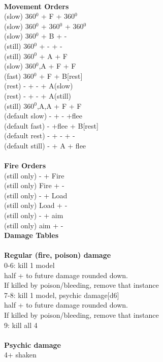 \ \\ {\bf Movement Orders } \\
(slow) 360$^0$ + F + 360$^0$ \\
(slow) 360$^0$ + 360$^0$ + 360$^0$ \\
(slow) 360$^0$ + B + - \\
(still) 360$^0$ + - + - \\
(still) 360$^0$ + A + F \\
(slow) 360$^0$,A + F + F \\
(fast) 360$^0$ + F + B[rest] \\
(rest) - + - + A(slow) \\
(rest) - + - + A(still) \\
(still) 360$^0$,A,A + F + F \\
(default slow) - + - +flee \\
(default fast) - +flee + B[rest] \\
(default rest) - + - + - \\
(default still) - + A + flee \\
\ \\ {\bf Fire Orders } \\
(still only) - + Fire \\
(still only) Fire + -  \\
(still only) - + Load \\
(still only) Load + - \\
(still only) - + aim \\
(still only) aim + -  \\



{\bf Damage Tables} \\
\ \\ {\bf Regular (fire, poison) damage } \\
0-6: kill 1 model\\ half + to future damage rounded down. \\ If killed by poison/bleeding, remove that instance \\
7-8: kill 1 model, psychic damage[d6]\\ half + to future damage rounded down. \\If killed by poison/bleeding, remove that instance \\
9: kill all 4 \\
\ \\ {\bf Psychic damage } \\
4+ shaken \\


